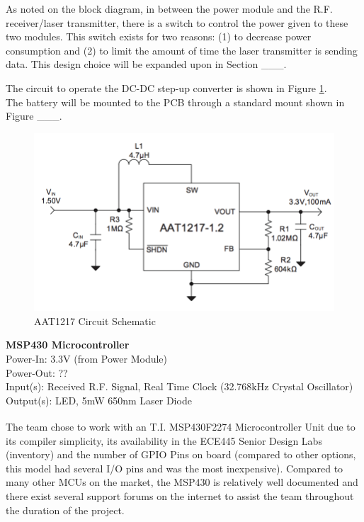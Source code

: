 \documentclass[letterpaper,10pt]{article}
\begin{document}
\begin{spacing}{1.15}
As noted on the block diagram, in between the power module and the R.F. receiver/laser transmitter, there is a switch to control the power given to these two modules. This switch exists for two reasons: (1) to decrease power consumption and (2) to limit the amount of time the laser transmitter is sending data. This design choice will be expanded upon in Section \_\_\_.

The circuit to operate the DC-DC step-up converter is shown in Figure \ref{fig:aat1217-voltage-converter-circuit}. \\

The battery will be mounted to the PCB through a standard mount shown in Figure \_\_\_. 

\begin{figure} [H]
	\centering
	\includegraphics[scale=0.5]{AAT1217_Voltage_Converter_Schematic.png}
	\caption{AAT1217 Circuit Schematic\label{fig:aat1217-voltage-converter-circuit}}
\end{figure}

\normalsize\textbf{MSP430 Microcontroller} \\
Power-In: 3.3V (from Power Module) \\
Power-Out: ?? \\
Input(s): Received R.F. Signal, Real Time Clock (32.768kHz Crystal Oscillator) \\
Output(s): LED, 5mW 650nm Laser Diode

The team chose to work with an T.I. MSP430F2274 Microcontroller Unit \textsuperscript{\cite{MSP430F2274}} due to its compiler simplicity, its availability in the ECE445 Senior Design Labs (inventory) and the number of GPIO Pins on board (compared to other options, this model had several I/O pins and was the most inexpensive). Compared to many other MCUs on the market, the MSP430 is relatively well documented and there exist several support forums on the internet to assist the team throughout the duration of the project.


\end{spacing}
\end{document}

